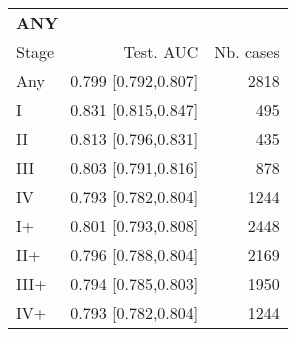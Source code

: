 \begin{table}[ht]
\centering
\begin{tabular}{lrr}
  \toprule
  \multicolumn{3}{l}{\textbf{ANY}}\\
Stage & Test. AUC & Nb. cases \\ 
  \midrule
Any & 0.799 [0.792,0.807] & 2818 \\ 
   \addlinespace
I & 0.831 [0.815,0.847] & 495 \\ 
  II & 0.813 [0.796,0.831] & 435 \\ 
  III & 0.803 [0.791,0.816] & 878 \\ 
  IV & 0.793 [0.782,0.804] & 1244 \\ 
   \addlinespace
I+ & 0.801 [0.793,0.808] & 2448 \\ 
  II+ & 0.796 [0.788,0.804] & 2169 \\ 
  III+ & 0.794 [0.785,0.803] & 1950 \\ 
  IV+ & 0.793 [0.782,0.804] & 1244 \\ 
   \bottomrule
\end{tabular}
\end{table}